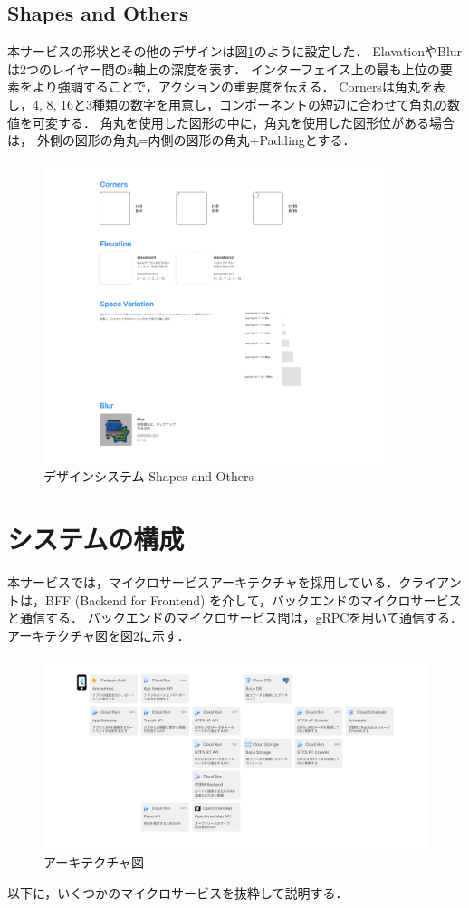 \subsection{Shapes and Others}
    本サービスの形状とその他のデザインは図\ref{fig:shapes}のように設定した．
    ElavationやBlurは2つのレイヤー間のz軸上の深度を表す．
    インターフェイス上の最も上位の要素をより強調することで，アクションの重要度を伝える．
    Cornersは角丸を表し，4, 8, 16と3種類の数字を用意し，コンポーネントの短辺に合わせて角丸の数値を可変する．
    角丸を使用した図形の中に，角丸を使用した図形位がある場合は，
    外側の図形の角丸=内側の図形の角丸+Paddingとする．
\begin{figure}
    \centering
    \includegraphics[width=10cm]{images/shapes.png}
    \caption{デザインシステム Shapes and Others}
    \label{fig:shapes}
\end{figure}

\section{システムの構成}
本サービスでは，マイクロサービスアーキテクチャを採用している．クライアントは，BFF (Backend for Frontend) を介して，バックエンドのマイクロサービスと通信する．
バックエンドのマイクロサービス間は，gRPCを用いて通信する．アーキテクチャ図を図\ref{fig:architecture}に示す．
\begin{figure}
    \centering
    \includegraphics[width=14cm]{images/architecture_diagram.png}
    \caption{アーキテクチャ図}
    \label{fig:architecture}
\end{figure}
以下に，いくつかのマイクロサービスを抜粋して説明する．

